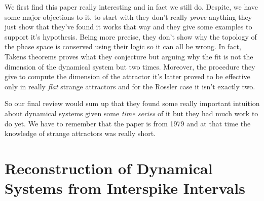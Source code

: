 \documentclass[10pt]{article}
\begin{document}
We first find this paper really interesting and in fact we still do. Despite, we have some major objections to it, to start with they don't really \textit{prove} anything they just show that they've found it works that way and they give some examples to support it's hypothesis. Being more precise, they don't show why the topology of the phase space is conserved using their logic so it can all be wrong. In fact, Takens theorems \cite{takens} proves what they conjecture but arguing why the fit is not the dimension of the dynamical system but two times. Moreover, the procedure they give to compute the dimension of the attractor it's latter proved to be effective only in really \textit{flat} strange attractors and for the Rossler case it isn't exactly two.

So our final review would sum up that they found some really important intuition about dynamical systems given some \textit{time series} of it but they had much work to do yet. We have to remember that the paper is from 1979 and at that time the knowledge of strange attractors was really short.

\section{Reconstruction of Dynamical Systems from Interspike Intervals}
\end{document}
